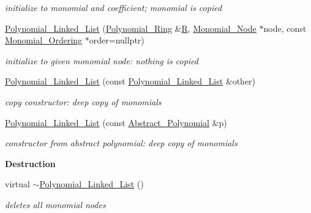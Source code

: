 \begin{Indent}
\begin{DoxyCompactItemize}
\begin{DoxyCompactList}\small\item\em initialize to monomial and coefficient; monomial is copied \end{DoxyCompactList}\item 
\mbox{\label{group__polygroup_a67949390f9d60f7cc3a0e9eef8b60e37}} 
\hyperlink{group__polygroup_a67949390f9d60f7cc3a0e9eef8b60e37}{Polynomial\+\_\+\+Linked\+\_\+\+List} (\hyperlink{group__polygroup_class_polynomial___ring}{Polynomial\+\_\+\+Ring} \&\hyperlink{group__polygroup_a551ade20b7dcd96c227dd0401f6ffbbe}{R}, \hyperlink{group__polygroup_class_monomial___node}{Monomial\+\_\+\+Node} $\ast$node, const \hyperlink{group__orderinggroup_class_monomial___ordering}{Monomial\+\_\+\+Ordering} $\ast$order=nullptr)
\begin{DoxyCompactList}\small\item\em initialize to given monomial node\+: nothing is copied \end{DoxyCompactList}\item 
\mbox{\label{group__polygroup_abd37d81f9f973f93d380425882b0b7d6}} 
\hyperlink{group__polygroup_abd37d81f9f973f93d380425882b0b7d6}{Polynomial\+\_\+\+Linked\+\_\+\+List} (const \hyperlink{group__polygroup_class_polynomial___linked___list}{Polynomial\+\_\+\+Linked\+\_\+\+List} \&other)
\begin{DoxyCompactList}\small\item\em copy constructor\+: deep copy of monomials \end{DoxyCompactList}\item 
\mbox{\label{group__polygroup_a347fda55f27fa10327c9854913d416ce}} 
\hyperlink{group__polygroup_a347fda55f27fa10327c9854913d416ce}{Polynomial\+\_\+\+Linked\+\_\+\+List} (const \hyperlink{group__polygroup_class_abstract___polynomial}{Abstract\+\_\+\+Polynomial} \&p)
\begin{DoxyCompactList}\small\item\em constructor from abstract polynomial\+: deep copy of monomials \end{DoxyCompactList}\end{DoxyCompactItemize}
\end{Indent}
\begin{Indent}\textbf{ Destruction}\par
\begin{DoxyCompactItemize}
\item 
\mbox{\label{group__polygroup_a02235c20d279afa443ea836fd9336cfc}} 
virtual \hyperlink{group__polygroup_a02235c20d279afa443ea836fd9336cfc}{$\sim$\+Polynomial\+\_\+\+Linked\+\_\+\+List} ()
\begin{DoxyCompactList}\small\item\em deletes all monomial nodes \end{DoxyCompactList}\end{DoxyCompactItemize}
\end{Indent}
